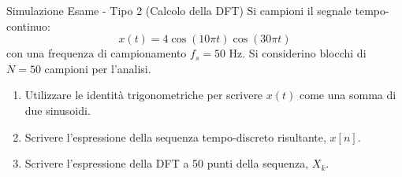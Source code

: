 
\begin{esercizio}{Simulazione Esame - Tipo 2 (Calcolo della DFT)}
    Si campioni il segnale tempo-continuo:
    \[
        x(t) = 4\cos(10\pi t) \cos(30\pi t)
    \]
    con una frequenza di campionamento $f_s = 50$ Hz. Si considerino blocchi di $N=50$ campioni per l'analisi.
    
    \begin{enumerate}
        \item Utilizzare le identità trigonometriche per scrivere $x(t)$ come una somma di due sinusoidi.
        \item Scrivere l'espressione della sequenza tempo-discreto risultante, $x[n]$.
        \item Scrivere l'espressione della DFT a 50 punti della sequenza, $X_k$.
    \end{enumerate}
\end{esercizio}